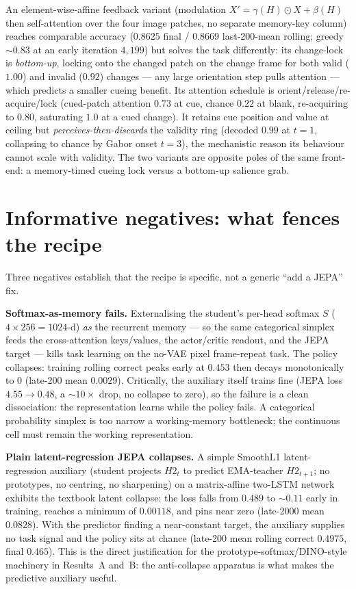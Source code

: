 An element-wise-affine feedback variant (modulation $X'=\gamma(H)\odot X+\beta(H)$ then
self-attention over the four image patches, no separate memory-key column) reaches comparable
accuracy ($0.8625$ final / $0.8669$ last-200-mean rolling; greedy $\sim0.83$ at an early
iteration $4{,}199$) but solves the task differently: its change-lock is \emph{bottom-up},
locking onto the changed patch on the change frame for both valid ($1.00$) and invalid
($0.92$) changes --- any large orientation step pulls attention --- which predicts a smaller
cueing benefit. Its attention schedule is orient/release/re-acquire/lock (cued-patch attention
$0.73$ at cue, chance $0.22$ at blank, re-acquiring to $0.80$, saturating $1.0$ at a cued
change). It retains cue position and value at ceiling but \emph{perceives-then-discards} the
validity ring (decoded $0.99$ at $t{=}1$, collapsing to chance by Gabor onset $t{=}3$), the
mechanistic reason its behaviour cannot scale with validity. The two variants are opposite
poles of the same front-end: a memory-timed cueing lock versus a bottom-up salience grab.

\section{Informative negatives: what fences the recipe}
\label{sec:jepa-negatives}
Three negatives establish that the recipe is specific, not a generic ``add a JEPA'' fix.

\textbf{Softmax-as-memory fails.} Externalising the student's per-head softmax $S$
($4\times256=1024$-d) \emph{as} the recurrent memory --- so the same categorical simplex feeds
the cross-attention keys/values, the actor/critic readout, and the JEPA target --- kills task
learning on the no-VAE pixel frame-repeat task. The policy collapses: training rolling correct
peaks early at $0.453$ then decays monotonically to $0$ (late-200 mean $0.0029$). Critically,
the auxiliary itself trains fine (JEPA loss $4.55\to0.48$, a $\sim10\times$ drop, no collapse
to zero), so the failure is a clean dissociation: the representation learns while the policy
fails. A categorical probability simplex is too narrow a working-memory bottleneck; the
continuous cell must remain the working representation.

\textbf{Plain latent-regression JEPA collapses.} A simple SmoothL1 latent-regression auxiliary
(student projects $H2_t$ to predict EMA-teacher $H2_{t{+}1}$; no prototypes, no centring, no
sharpening) on a matrix-affine two-LSTM network exhibits the textbook latent collapse: the loss
falls from $0.489$ to $\sim0.11$ early in training, reaches a minimum of $0.00118$, and pins
near zero (late-2000 mean $0.0828$). With the predictor finding a near-constant target, the
auxiliary supplies no task signal and the policy sits at chance (late-200 mean rolling correct
$0.4975$, final $0.465$). This is the direct justification for the prototype-softmax/DINO-style
machinery in Results~A and~B: the anti-collapse apparatus is what makes the predictive
auxiliary useful.

